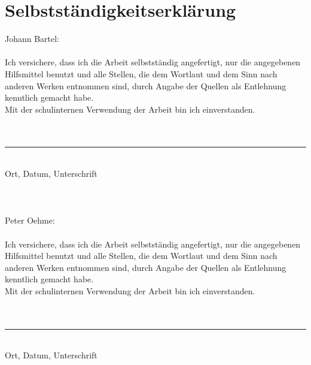 \chapter*{Selbstständigkeitserklärung}
Johann Bartel:\\\\
Ich versichere, dass ich die Arbeit selbstständig angefertigt, nur die angegebenen Hilfsmittel benutzt und alle Stellen, die dem Wortlaut und dem Sinn nach anderen Werken entnommen sind, durch Angabe der Quellen als Entlehnung kenntlich gemacht habe.\\
Mit der schulinternen Verwendung der Arbeit bin ich einverstanden.\\\\\\
\rule{12cm}{0.1mm}\\
Ort, Datum, Unterschrift\\\\\\\\
Peter Oehme:\\\\
Ich versichere, dass ich die Arbeit selbstständig angefertigt, nur die angegebenen Hilfsmittel benutzt und alle Stellen, die dem Wortlaut und dem Sinn nach anderen Werken entnommen sind, durch Angabe der Quellen als Entlehnung kenntlich gemacht habe.\\
Mit der schulinternen Verwendung der Arbeit bin ich einverstanden.\\\\\\
\rule{12cm}{0.1mm}\\
Ort, Datum, Unterschrift
